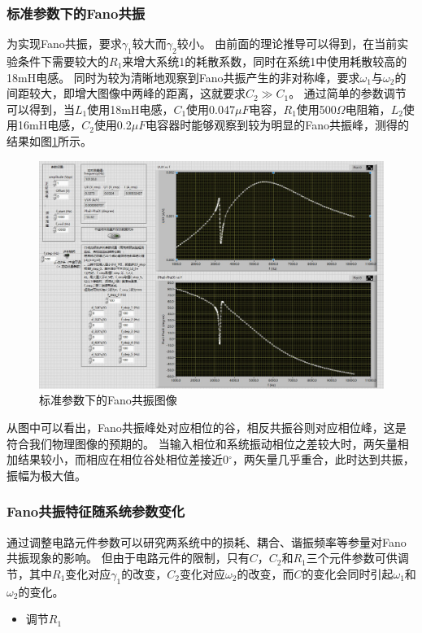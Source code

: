 \documentclass[12pt, a4paper]{ctexart}
\begin{document}
\subsubsection{标准参数下的Fano共振}

为实现Fano共振，要求$\gamma_1$较大而$\gamma_2$较小。
由前面的理论推导可以得到，在当前实验条件下需要较大的$R_1$来增大系统1的耗散系数，同时在系统1中使用耗散较高的18mH电感。
同时为较为清晰地观察到Fano共振产生的非对称峰，要求$\omega_1$与$\omega_2$的间距较大，即增大图像中两峰的距离，这就要求$C_2 \gg C_1$。
通过简单的参数调节可以得到，当$L_1$使用18mH电感，$C_1$使用0.047$\mu F$电容，$R_1$使用500$\Omega$电阻箱，$L_2$使用16mH电感，$C_2$使用0.2$\mu F$电容器时能够观察到较为明显的Fano共振峰，测得的结果如图\ref{fig:5}所示。
\begin{figure}[!ht]
    \centering
    \includegraphics[width=0.8\linewidth]{./figure/standardFano.jpg}
    \caption{标准参数下的Fano共振图像}
    \label{fig:5}
\end{figure}

从图中可以看出，Fano共振峰处对应相位的谷，相反共振谷则对应相位峰，这是符合我们物理图像的预期的。
当输入相位和系统振动相位之差较大时，两矢量相加结果较小，而相应在相位谷处相位差接近0$^{\circ}$，两矢量几乎重合，此时达到共振，振幅为极大值。

\subsubsection{Fano共振特征随系统参数变化}

通过调整电路元件参数可以研究两系统中的损耗、耦合、谐振频率等参量对Fano共振现象的影响。
但由于电路元件的限制，只有$C$，$C_2$和$R_1$三个元件参数可供调节，其中$R_1$变化对应$\gamma_1$的改变，$C_2$变化对应$\omega_2$的改变，而$C$的变化会同时引起$\omega_1$和$\omega_2$的变化。

\begin{itemize}
    \item 调节$R_1$
\end{itemize}
\end{document}

